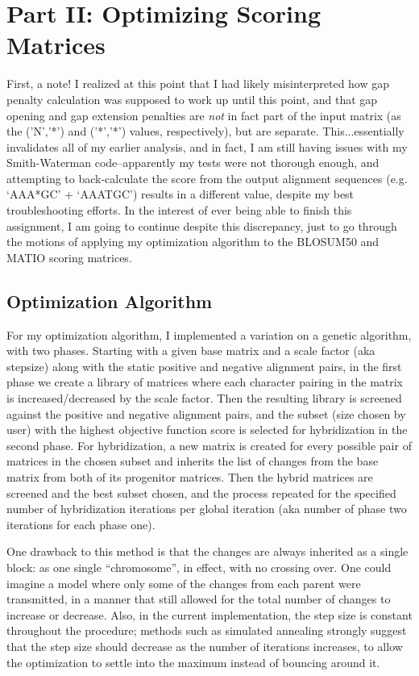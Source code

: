 \documentclass{article}
\begin{document}
\section{Part II: Optimizing Scoring Matrices}

First, a note! I realized at this point that I had likely misinterpreted how gap penalty calculation was supposed to work up until this point, and that gap opening and gap extension penalties are {\it not} in fact part of the input matrix (as the ('N','*') and ('*','*') values, respectively), but are separate. This...essentially invalidates all of my earlier analysis, and in fact, I am still having issues with my Smith-Waterman code--apparently my tests were not thorough enough, and attempting to back-calculate the score from the output alignment sequences (e.g. `AAA*GC' + `AAATGC') results in a different value, despite my best troubleshooting efforts. In the interest of ever being able to finish this assignment, I am going to continue despite this discrepancy, just to go through the motions of applying my optimization algorithm to the BLOSUM50 and MATIO scoring matrices. 

\subsection{Optimization Algorithm}

For my optimization algorithm, I implemented a variation on a genetic algorithm, with two phases. Starting with a given base matrix and a scale factor (aka stepsize) along with the static positive and negative alignment pairs, in the first phase we create a library of matrices where each character pairing in the matrix is increased/decreased by the scale factor. Then the resulting library is screened against the positive and negative alignment pairs, and the subset (size chosen by user) with the highest objective function score is selected for hybridization in the second phase. For hybridization, a new matrix is created for every possible pair of matrices in the chosen subset and inherits the list of changes from the base matrix from both of its progenitor matrices. Then the hybrid matrices are screened and the best subset chosen, and the process repeated for the specified number of hybridization iterations per global iteration (aka number of phase two iterations for each phase one).
\par One drawback to this method is that the changes are always inherited as a single block: as one single ``chromosome'', in effect, with no crossing over. One could imagine a model where only some of the changes from each parent were transmitted, in a manner that still allowed for the total number of changes to increase or decrease. Also, in the current implementation, the step size is constant throughout the procedure; methods such as simulated annealing strongly suggest that the step size should decrease as the number of iterations increases, to allow the optimization to settle into the maximum instead of bouncing around it.
\end{document}
